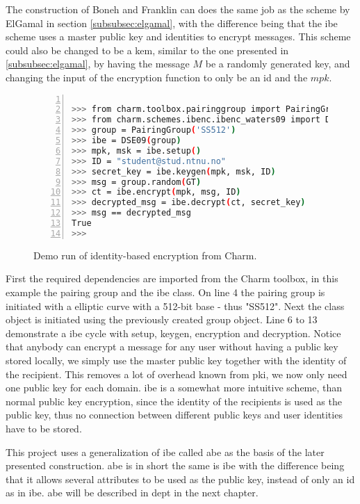 \par The construction of Boneh and Franklin can does the same job as the scheme by ElGamal in section \ref{subsubsec:elgamal}, with the difference being that the \gls{ibe} scheme uses a master public key and identities to encrypt messages. This scheme could also be changed to be a \gls{kem}, similar to the one presented in \ref{subsubsec:elgamal}, by having the message $M$ be a randomly generated key, and changing the input of the encryption function to only be an id and the $mpk$.



\begin{figure}[H]
\begin{lstlisting}[language=bash, xleftmargin=2em, frame=single, framexleftmargin=1.5em, breaklines=true, numbers=left, numbersep=5pt, numberstyle=\tiny\color{mygray}]

>>> from charm.toolbox.pairinggroup import PairingGroup, GT
>>> from charm.schemes.ibenc.ibenc_waters09 import DSE09
>>> group = PairingGroup('SS512')
>>> ibe = DSE09(group)
>>> mpk, msk = ibe.setup()
>>> ID = "student@stud.ntnu.no"
>>> secret_key = ibe.keygen(mpk, msk, ID)
>>> msg = group.random(GT)
>>> ct = ibe.encrypt(mpk, msg, ID)
>>> decrypted_msg = ibe.decrypt(ct, secret_key)
>>> msg == decrypted_msg
True
>>> 

\end{lstlisting}
\caption{Demo run of identity-based encryption \cite{ibe_waters09} from Charm.}
\label{fig:ibenc}
\end{figure}

First the required dependencies are imported from the Charm toolbox, in this example the pairing group and the \gls{ibe} class. On line 4 the pairing group is initiated with a elliptic curve with a 512-bit base - thus "SS512". Next the class object is initiated using the previously created group object. Line 6 to 13 demonstrate a \gls{ibe} cycle with setup, keygen, encryption and decryption.
Notice that anybody can encrypt a message for any user without having a public key stored locally, we simply use the master public key together with the identity of the recipient. This removes a lot of overhead known from \gls{pki}, we now only need one public key for each domain. \Gls{ibe} is a somewhat more intuitive scheme, than normal public key encryption, since the identity of the recipients is used as the public key, thus no connection between different public keys and user identities have to be stored.
\par This project uses a generalization of \gls{ibe} called \gls{abe} as the basis of the later presented construction. \Gls{abe} is in short the same is \gls{ibe} with the difference being that it allows several attributes to be used as the public key, instead of only an id as in \gls{ibe}. \Gls{abe} will be described in dept in the next chapter.

